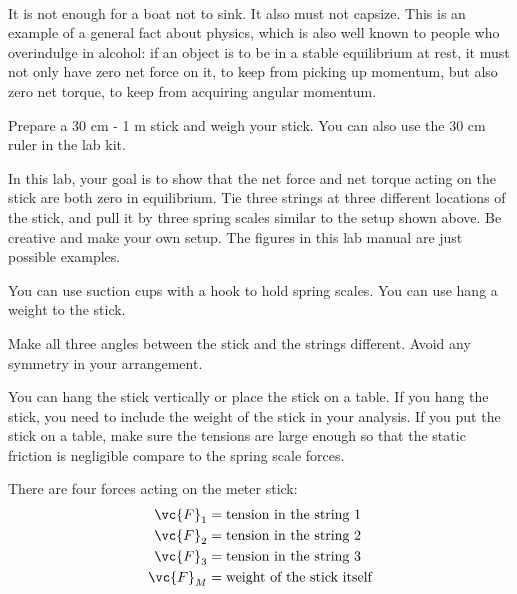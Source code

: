 \renewcommand\thechapter{c1.14}
\label{lab:covid-torque}
\covid\ 

\apparatus
{}


\introduction

It is not enough for a boat not to sink.  It also must not
capsize.  This is an example of a general fact about
physics, which is also well known to people who overindulge
in alcohol: if an object is to be in a stable equilibrium at
rest, it must not only have zero net force on it, to keep
from picking up momentum, but also zero net torque, to keep
from acquiring angular momentum.


\observations

Prepare a 30 cm - 1 m stick and weigh your stick. You can also use the 30 cm ruler in the lab kit. 

In this lab, your goal is to show that the net force and net torque acting on the stick are both zero in equilibrium. 
Tie three strings at three different locations of the stick, and pull it by three spring scales similar to the setup shown above. 
Be creative and make your own setup. 
The figures in this lab manual are just possible examples. 

You can use suction cups with a hook to hold spring scales. 
You can use hang a weight to the stick. 

Make all three angles between the stick and the strings different. Avoid any symmetry in your arrangement. 

You can hang the stick vertically or place the stick on a table. If you hang the stick, you need to include the weight of the stick in your analysis. If you put the stick on a table, make sure the tensions are large enough so that the static friction is negligible compare to the spring scale forces.


There are four forces acting on the meter stick:
\begin{align*}
       \vc{F}_1 &=    \text{tension in the string 1}  \\
       \vc{F}_2 &=    \text{tension in the string 2}  \\
       \vc{F}_3 &=    \text{tension in the string 3}  \\
       \vc{F}_{M} &=    \text{weight of the stick itself} 
\end{align*}

